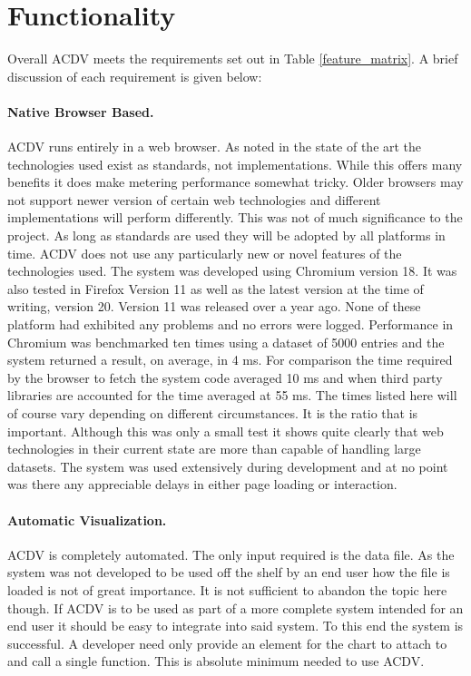 \documentclass[a4paper, 11pt, titlepage, onehalfspacing]{report}
\begin{document}
\section{Functionality}
\label{Functionality}
Overall AC\lightning{}DV meets the requirements set out in Table \ref{feature_matrix}. A brief discussion of each requirement is given below:

\paragraph{Native Browser Based.}AC\lightning{}DV runs entirely in a web browser. As noted in the state of the art the technologies used exist as standards, not implementations. While this offers many benefits it does make metering performance somewhat tricky. Older browsers may not support newer version of certain web technologies and different implementations will perform differently. This was not of much significance to the project. As long as standards are used they will be adopted by all platforms in time. AC\lightning{}DV does not use any particularly new or novel features of the technologies used. The system was developed using Chromium version 18. It was also tested in Firefox Version 11 as well as the latest version at the time of writing, version 20. Version 11 was released over a year ago. None of these platform had exhibited any problems and no errors were logged. Performance in Chromium was benchmarked ten times using a dataset of 5000 entries and the system returned a result, on average, in 4 ms. For comparison the time required by the browser to fetch the system code averaged 10 ms and when third party libraries are accounted for the time averaged at 55 ms. The times listed here will of course vary depending on different circumstances. It is the ratio that is important. Although this was only a small test it shows quite clearly that web technologies in their current state are more than capable of handling large datasets. The system was used extensively during development and at no point was there any appreciable delays in either page loading or interaction.

\paragraph{Automatic Visualization.}AC\lightning{}DV is completely automated. The only input required is the data file. As the system was not developed to be used off the shelf by an end user how the file is loaded is not of great importance. It is not sufficient to abandon the topic here though. If AC\lightning{}DV is to be used as part of a more complete system intended for an end user it should be easy to integrate into said system. To this end the system is successful. A developer need only provide an element for the chart to attach to and call a single function. This is absolute minimum needed to use AC\lightning{}DV.
\end{document}
